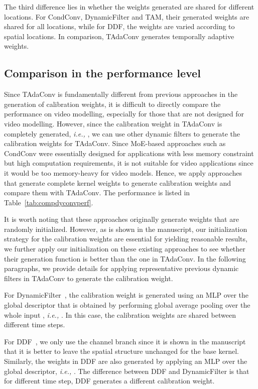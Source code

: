 \documentclass[10pt,journal,compsoc]{IEEEtran}
\begin{document}
The third difference lies in whether the weights generated are shared for different locations. 
For CondConv, DynamicFilter and TAM, their generated weights are shared for all locations, while for DDF, the weights are varied according to spatial locations. In comparison, TAdaConv generates temporally adaptive weights.

\subsection{Comparison in the performance level}
Since TAdaConv is fundamentally different from previous approaches in the generation of calibration weights, it is difficult to directly compare the performance on video modelling, especially for those that are not designed for video modelling. 
However, since the calibration weight in TAdaConv  is completely generated, \textit{i.e.,} , we can use other dynamic filters to generate the calibration weights for TAdaConv. 
Since MoE-based approaches such as CondConv were essentially designed for applications with less memory constraint but high computation requirements, it is not suitable for video applications since it would be too memory-heavy for video models. 
Hence, we apply approaches that generate complete kernel weights to generate calibration weights and compare them with TAdaConv. 
The performance is listed in Table~\ref{tab:compdyconvperf}.

It is worth noting that these approaches originally generate weights that are randomly initialized. 
However, as is shown in the manuscript, our initialization strategy for the calibration weights are essential for yielding reasonable results, we further apply our initialization on these existing approaches to see whether their generation function is better than the one in TAdaConv.
In the following paragraphs, we provide details for applying representative previous dynamic filters in TAdaConv to generate the calibration weight.

For DynamicFilter~\cite{dynamicfilter}, the calibration weight  is generated using an MLP over the global descriptor that is obtained by performing global average pooling over the whole input , \textit{i.e.,} .
In this case, the calibration weights are shared between different time steps. 

For DDF~\cite{ddf}, we only use the channel branch since it is shown in the manuscript that it is better to leave the spatial structure unchanged for the base kernel.
Similarly, the weights in DDF are also generated by applying an MLP over the global descriptor, \textit{i.e.,} .
The difference between DDF and DynamicFilter is that for different time step, DDF generates a different calibration weight.
\end{document}
